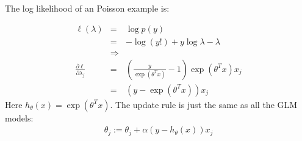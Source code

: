 \begin{answer}

The log likelihood of an Poisson example is:

\begin{eqnarray*}
\ell(\lambda) 
    &=& \log p(y) \\
    &=& - \log(y!) + y\log \lambda - \lambda \\
    &\Rightarrow& \\
\frac{\partial \ell}{\partial \lambda_j}
    &=& (\frac{y}{\exp(\theta^T x)}-1) \exp(\theta^T x) x_j \\
    &=& (y - \exp(\theta^T x))x_j
\end{eqnarray*}
Here $h_{\theta}(x)=\exp (\theta^T x)$. 
The update rule is just the same as all the GLM models:
\begin{eqnarray*}
    \theta_j := \theta_j + \alpha (y-h_{\theta}(x)) x_j
\end{eqnarray*}

\end{answer}
